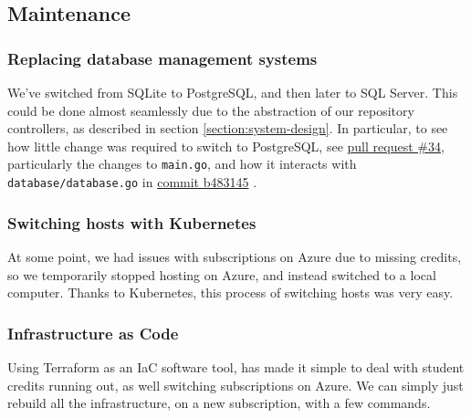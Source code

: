 \subsection{Maintenance}

\subsubsection{Replacing database management systems}

We've switched from SQLite to PostgreSQL, and then later to SQL Server. This could be done almost seamlessly due to the abstraction of our repository controllers, as described in section \ref{section:system-design}.
In particular, to see how little change was required to switch to PostgreSQL, see \href{https://github.com/Devops-2022-Group-R/itu-minitwit/pull/34}{pull request \#34}, particularly the changes to \texttt{main.go}, and how it interacts with \texttt{database/database.go} in \href{https://github.com/Devops-2022-Group-R/itu-minitwit/pull/34/commits/b4831458ae940e9b4c42dd929fe9be73143580d4#diff-9e185f29fa355d7dd8fdd9c9ff1d0723b85206aa7d37c4eec93997005dc291eb}{commit b483145} \cite{commit:switching-to-psql}.


\subsubsection{Switching hosts with Kubernetes}

At some point, we had issues with subscriptions on Azure due to missing credits, so we temporarily stopped hosting on Azure, and instead switched to a local computer. Thanks to Kubernetes, this process of switching hosts was very easy.


\subsubsection{Infrastructure as Code}

Using Terraform as an IaC software tool, has made it simple to deal with student credits running out, as well switching subscriptions on Azure. We can simply just rebuild all the infrastructure, on a new subscription, with a few commands.
